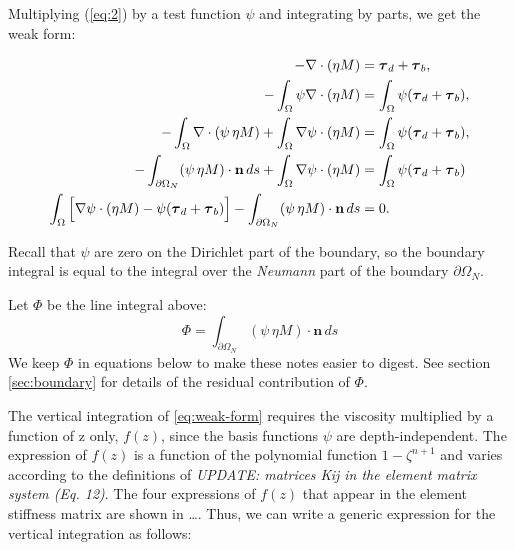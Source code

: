 \documentclass{amsart}
\newcommand{\N}{\mathbf{n}}
\newcommand{\T}{\boldsymbol{\tau}}
\newcommand{\I}{\ensuremath{\int_{\Omega}}}
\newcommand{\boundary}{\partial \Omega_N}
\newcommand{\bI}{\ensuremath{\int_{\boundary}}}
\newcommand{\etaM}{\ensuremath{\eta M}}
\newcommand{\basalshearstress}[1]{\T_{b#1}}
\newcommand{\taub}{\basalshearstress{}}
\newcommand{\drivingstress}[1]{\T_{d#1}}
\newcommand{\taud}{\drivingstress{}}
\begin{document}
Multiplying (\ref{eq:2}) by a test function $\psi$ and integrating by parts, we get the weak form:

\begin{align}
 - \nabla \cdot (\etaM) & = \taud + \taub,\notag \\
 - \I \psi \nabla \cdot (\etaM) & = \I \psi (\taud + \taub),\notag \\
 - \I \nabla \cdot (\psi\, \etaM) + \I \nabla \psi \cdot (\etaM) & = \I \psi (\taud + \taub),\notag \\
 - \bI (\psi\, \etaM)\cdot \N\, ds + \I \nabla \psi \cdot (\etaM) & = \I \psi (\taud + \taub)\notag \\
  \label{eq:8}
  \I \Big[\nabla \psi \cdot (\etaM) - \psi (\taud + \taub)\Big] - \bI (\psi\, \etaM) \cdot \N\, ds &= 0.
\end{align}

Recall that $\psi$ are zero on the Dirichlet part of the boundary, so the boundary integral is equal to the integral over the \emph{Neumann} part of the boundary $\boundary$.

Let $\Phi$ be the line integral above:
\begin{equation}
  \label{eq:9}
  \Phi = \bI (\psi\, \etaM) \cdot \N\, ds
\end{equation}
We keep $\Phi$ in equations below to make these notes easier to digest. See section \ref{sec:boundary} for details of the residual contribution of $\Phi$.

The vertical integration of \eqref{eq:weak-form} requires the viscosity multiplied by a function of z only, $f(z)$, since the basis functions $\psi$ are depth-independent. The expression of $f(z)$ is a function of the polynomial function $1-\zeta^{n+1}$ and varies according to the definitions of \emph{UPDATE: matrices Kij in the element matrix system (Eq. 12)}. The four expressions of $f(z)$ that appear in the element stiffness matrix are shown in \ldots. Thus, we can write a generic expression for the vertical integration as follows:
\end{document}
